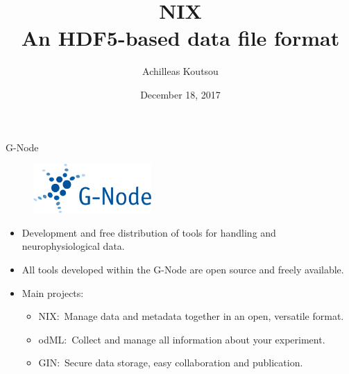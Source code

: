\documentclass[10pt]{beamer}
\title[NIX]{NIX\\An HDF5-based data file format}
\author{Achilleas Koutsou}
\date{December 18, 2017}
\begin{document}
\maketitle

\begin{frame}{G-Node}

    \begin{figure}
        \includegraphics[width=0.4\textwidth]{g-node-logo.eps}
    \end{figure}

    \begin{itemize}
        \item Development and free distribution of tools for handling and neurophysiological data.
        \item All tools developed within the G-Node are open source and freely available.
        \item Main projects:
            \begin{itemize}
                \item {\color{red}NIX}:\ Manage data and metadata together in an open, versatile format.
                \item odML:\ Collect and manage all information about your experiment.
                \item GIN:\ Secure data storage, easy collaboration and publication.
            \end{itemize}
    \end{itemize}
\end{frame}
\end{document}

